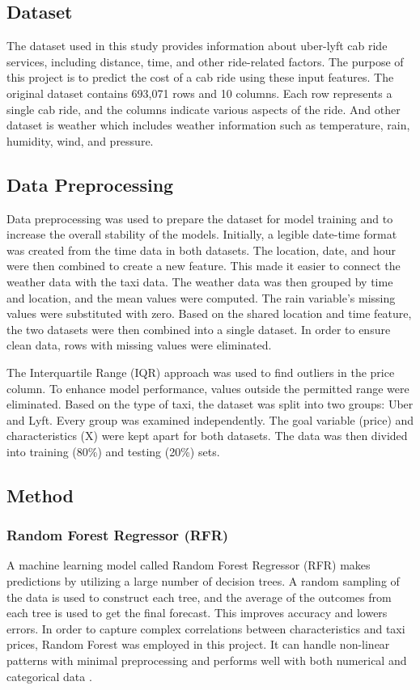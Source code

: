 \documentclass[letterpaper, 10 pt, conference]{ieeeconf}  %
\begin{document}
\subsection{Dataset}

The dataset used in this study provides information about uber-lyft cab ride services, including distance, time, and other ride-related factors. The purpose of this project is to predict the cost of a cab ride using these input features. The original dataset contains 693,071 rows and 10 columns. Each row represents a single cab ride, and the columns indicate various aspects of the ride. And other dataset is weather which includes weather information such as temperature, rain, humidity, wind, and pressure.


\subsection{Data Preprocessing}

Data preprocessing was used to prepare the dataset for model training and to increase the overall stability of the models. Initially, a legible date-time format was created from the time data in both datasets. The location, date, and hour were then combined to create a new feature. This made it easier to connect the weather data with the taxi data. The weather data was then grouped by time and location, and the mean values were computed. The rain variable's missing values were substituted with zero. Based on the shared location and time feature, the two datasets were then combined into a single dataset. In order to ensure clean data, rows with missing values were eliminated.

The Interquartile Range (IQR) approach was used to find outliers in the price column. To enhance model performance, values outside the permitted range were eliminated. Based on the type of taxi, the dataset was split into two groups: Uber and Lyft. Every group was examined independently. The goal variable (price) and characteristics (X) were kept apart for both datasets. The data was then divided into training (80\%) and testing (20\%) sets.

\subsection{Method}


\subsubsection{Random Forest Regressor (RFR)}
A machine learning model called Random Forest Regressor (RFR) makes predictions by utilizing a large number of decision trees. A random sampling of the data is used to construct each tree, and the average of the outcomes from each tree is used to get the final forecast. This improves accuracy and lowers errors. In order to capture complex correlations between characteristics and taxi prices, Random Forest was employed in this project. It can handle non-linear patterns with minimal preprocessing and performs well with both numerical and categorical data \cite{s1}.
\end{document}
